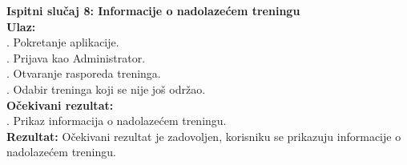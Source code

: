\documentclass[times, utf8, zavrsni]{fer}
\begin{document}
	    \noindent \textbf{Ispitni slučaj 8: Informacije o nadolazećem treningu}\\
			\textbf{Ulaz:}\\
			    . Pokretanje aplikacije.\\
			    . Prijava kao Administrator.\\
			    . Otvaranje rasporeda treninga.\\
			    . Odabir treninga koji se nije još održao.\\
			   
			\noindent\textbf{Očekivani rezultat:}\\
			    . Prikaz informacija o nadolazećem treningu.\\
			    
			\noindent\textbf{Rezultat:}
			    \noindent Očekivani rezultat je zadovoljen, korisniku se prikazuju informacije o nadolazećem treningu.
			    
\end{document}

